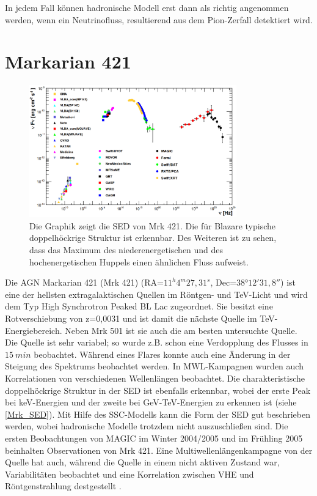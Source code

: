 In jedem Fall können hadronische Modell erst dann als richtig angenommen werden, wenn ein Neutrinofluss, resultierend aus dem Pion-Zerfall detektiert wird.\cite{Weekes}




\section{Markarian 421}
\label{sec:Mrk421}

\begin{figure}
    \centering
    \includegraphics[width=0.8\textwidth]{./Plots/02_Astroteilchenphysik/SED_Mrk421.png}
    \caption{Die Graphik zeigt die SED von Mrk 421. Die für Blazare typische doppelhöckrige Struktur ist erkennbar. 
     Des Weiteren ist zu sehen, dass das Maximum des niederenergetischen und des hochenergetischen Huppels einen ähnlichen Fluss aufweist.\cite{Mrk421_SED}}
    \label{Mrk_SED}
\end{figure}

Die AGN Markarian 421 (Mrk 421) (RA=$11^h 4^m 27,31^s$, Dec=$38°12' 31,8''$) ist eine der hellsten extragalaktischen Quellen im Röntgen- und TeV-Licht und wird dem Typ High Synchrotron Peaked BL Lac zugeordnet.
Sie besitzt eine Rotverschiebung von z=0,0031 und ist damit die nächste Quelle im TeV-Energiebereich.
Neben Mrk 501 ist sie auch die am besten untersuchte Quelle.
Die Quelle ist sehr variabel; so wurde z.B. schon eine Verdopplung des Flusses in $\SI{15}{min}$ beobachtet.
Während eines Flares konnte auch eine Änderung in der Steigung des Spektrums beobachtet werden.
In MWL-Kampagnen wurden auch Korrelationen von verschiedenen Wellenlängen beobachtet.
Die charakteristische doppelhöckrige Struktur in der SED ist ebenfalls erkennbar, wobei der erste Peak bei keV-Energien und der zweite bei GeV-TeV-Energien zu erkennen ist (siehe \autoref{Mrk_SED}). 
Mit Hilfe des SSC-Modells kann die Form der SED gut beschrieben werden, wobei hadronische Modelle trotzdem nicht auszuschließen sind.
Die ersten Beobachtungen von MAGIC im Winter 2004/2005 und im Frühling 2005 beinhalten Observationen von Mrk 421.
Eine Multiwellenlängenkampagne von der Quelle hat auch, während die Quelle in einem nicht aktiven Zustand war, Variabilitäten beobachtet und eine Korrelation zwischen VHE und Röntgenstrahlung destgestellt \cite{MWL2009}.\cite{Weekes}